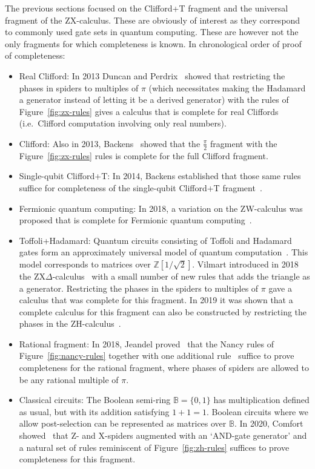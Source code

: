 \documentclass[a4paper,onecolumn,superscriptaddress,11pt,%
				unpublished,%
				allowfontchageintitle,%
				]{quantumarticle}
\begin{document}
The previous sections focused on the Clifford+T fragment and the universal fragment of the ZX-calculus. These are obviously of interest as they correspond to commonly used gate sets in quantum computing. These are however not the only fragments for which completeness is known. In chronological order of proof of completeness:
\begin{itemize}
	\item Real Clifford: In 2013 Duncan and Perdrix~\cite{DP3} showed that restricting the phases in spiders to multiples of $\pi$ (which necessitates making the Hadamard a generator instead of letting it be a derived generator) with the rules of Figure~\ref{fig:zx-rules} gives a calculus that is complete for real Cliffords (i.e.~Clifford computation involving only real numbers).
	\item Clifford: Also in 2013, Backens~\cite{BackensCompleteness} showed that the $\frac\pi2$ fragment with the Figure~\ref{fig:zx-rules} rules is complete for the full Clifford fragment.
	\item Single-qubit Clifford+T: In 2014, Backens established that those same rules suffice for completeness of the single-qubit Clifford+T fragment~\cite{backens2014zx}.
	\item Fermionic quantum computing: In 2018, a variation on the ZW-calculus was proposed that is complete for Fermionic quantum computing~\cite{hadzihasanovic2018diagrammatic}.
	\item Toffoli+Hadamard: Quantum circuits consisting of Toffoli and Hadamard gates form an approximately universal model of quantum computation~\cite{ShiToffoliHadamard}. This model corresponds to matrices over $\mathbb Z[1/\sqrt{2}]$. Vilmart introduced in 2018 the ZX$\Delta$-calculus~\cite{vilmartzxtriangle} with a small number of new rules that adds the triangle as a generator. Restricting the phases in the spiders to multiples of $\pi$ gave a calculus that was complete for this fragment. In 2019 it was shown that a complete calculus for this fragment can also be constructed by restricting the phases in the ZH-calculus~\cite{zhphasefree}.
	\item Rational fragment: In 2018, Jeandel proved~\cite{jeandel_rational_2018} that the Nancy rules of Figure~\ref{fig:nancy-rules} together with one additional rule~\cite{cyclo} suffice to prove completeness for the rational fragment, where phases of spiders are allowed to be any rational multiple of $\pi$.
	\item Classical circuits: The Boolean semi-ring $\mathbb B = \{0,1\}$ has multiplication defined as usual, but with its addition satisfying $1+1 = 1$. Boolean circuits where we allow post-selection can be represented as matrices over $\mathbb B$. In 2020, Comfort showed~\cite{ZXand} that Z- and X-spiders augmented with an `AND-gate generator' and a natural set of rules reminiscent of Figure~\ref{fig:zh-rules} suffices to prove completeness for this fragment.
\end{itemize}
\end{document}
